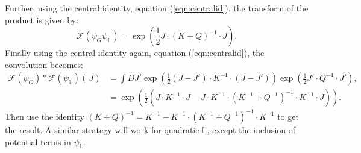     Further, using the central identity, equation (\ref{eqn:centralid}), the transform of the product is given by:
    \[\mathcal{F}(\psi_G  \psi_{\mathbb{L}}) = \exp\left( \frac{1}{2} J \cdot (K+Q)^{-1} \cdot J\right).\]
    Finally using the central identity again, equation (\ref{eqn:centralid}), the convolution becomes:
    \begin{align*}  \mathcal{F}(\psi_{G}) * \mathcal{F}(\psi_{\mathbb{L}}) (\, J) &=   \int D J' \exp \left( \frac{1}{2}(J-J') \cdot K^{-1} \cdot       (J-J')\right) \exp\left( \frac{1}{2} J' \cdot Q^{-1} \cdot J' \right),\\ 
    &=    \exp\left( \frac{1}{2} \left( J \cdot K^{-1} \cdot J -J \cdot K^{-1}\cdot(K^{-1} + Q^{-1})^{-1}\cdot K^{-1}\cdot J \right) \right).
    \end{align*}
    Then use the identity \( (K+Q)^{-1} = K^{-1} - K^{-1}\cdot(K^{-1} + Q^{-1})^{-1}\cdot K^{-1}\) to get the result. A similar strategy will work for quadratic \( \mathbb{L}\), except the inclusion of potential terms in \( \psi_{\mathbb{L}}\).
    
    \newpage 
    \vfill
    \newpage 